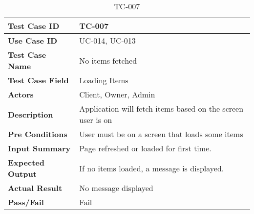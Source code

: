 
\begin{table}[h]
    \centering
    \caption{TC-007}
    \begin{tabular}{ |p{3.8cm}|p{8cm}| }
        \hline
        \textbf{Test Case ID}    & TC-007                                                      \\
        \hline
        \textbf{Use Case ID}     & UC-014, UC-013                                              \\
        \hline
        \textbf{Test Case Name}  & No items fetched                                            \\
        \hline
        \textbf{Test Case Field} & Loading Items                                               \\
        \hline
        \textbf{Actors}          & Client, Owner, Admin                                        \\
        \hline
        \textbf{Description}     & Application will fetch items based on the screen user is on \\
        \hline
        \textbf{Pre Conditions}  & User must be on a screen that loads some items              \\
        \hline
        \textbf{Input Summary}   & Page refreshed or loaded for first time.                    \\
        \hline
        \textbf{Expected Output} & If no items loaded, a message is displayed.                 \\
        \hline
        \textbf{Actual Result}   & No message displayed                                        \\
        \hline
        \textbf{Pass/Fail}       & Fail                                                        \\
        \hline
    \end{tabular}
\end{table}